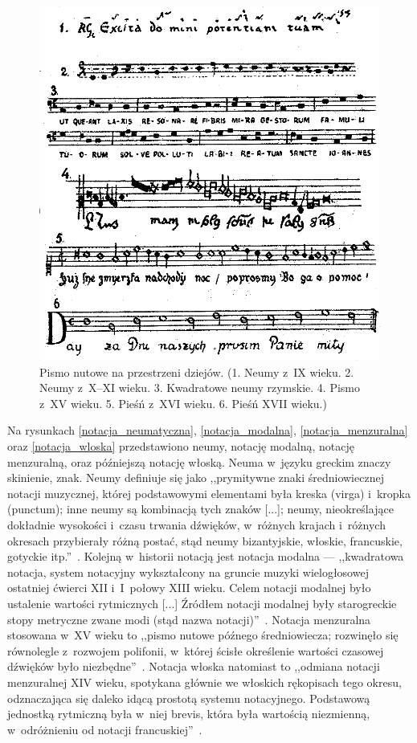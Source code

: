 \documentclass[polish,thesis,12pt]{dcsbook}
\begin{document}
\begin{figure}[H]
  \centering
  \includegraphics[scale=2.0,bb=0 0 197 204]{img/pismo nutowe.png}
  \caption{Pismo nutowe na przestrzeni dziejów. (1. Neumy z~IX wieku. 2. Neumy z~X--XI wieku. 3. Kwadratowe neumy rzymskie. 4. Pismo z~XV wieku. 5. Pieśń z~XVI wieku. 6. Pieśń XVII wieku.)~\cite{PodstawoweWiadomosci}}
  \label{pismo_nutowe}
\end{figure}

Na rysunkach \ref{notacja_neumatyczna}, \ref{notacja_modalna}, \ref{notacja_menzuralna} oraz \ref{notacja_wloska} przedstawiono neumy, notację modalną, notację menzuralną, oraz późniejszą notację włoską. Neuma w~języku greckim znaczy skinienie, znak. Neumy definiuje się jako ,,prymitywne znaki średniowiecznej notacji muzycznej, której podstawowymi elementami była kreska (virga) i~kropka (punctum); inne neumy są kombinacją tych znaków [...]; neumy, nieokreślające dokładnie wysokości i~czasu trwania dźwięków, w~różnych krajach i~różnych okresach przybierały różną postać, stąd neumy bizantyjskie, włoskie, francuskie, gotyckie itp.''~\cite{Slowniczek}. Kolejną w~historii notacją jest notacja modalna --- ,,kwadratowa notacja, system notacyjny wykształcony na gruncie muzyki wielogłosowej ostatniej ćwierci XII i~I~połowy XIII wieku. Celem notacji modalnej było ustalenie wartości rytmicznych [...] Źródłem notacji modalnej były starogreckie stopy metryczne zwane modi (stąd nazwa notacji)''~\cite{Encyklopedia}. Notacja menzuralna stosowana w~XV wieku to ,,pismo nutowe późnego średniowiecza; rozwinęło się równolegle z~rozwojem polifonii, w~której ścisłe określenie wartości czasowej dźwięków było niezbędne''~\cite{Slowniczek}. Notacja włoska natomiast to ,,odmiana notacji menzuralnej XIV wieku, spotykana głównie we włoskich rękopisach tego okresu, odznaczająca się daleko idącą prostotą systemu notacyjnego. Podstawową jednostką rytmiczną była w~niej brevis, która była wartością niezmienną, w~odróżnieniu od notacji francuskiej''~\cite{Encyklopedia}.
\end{document}
